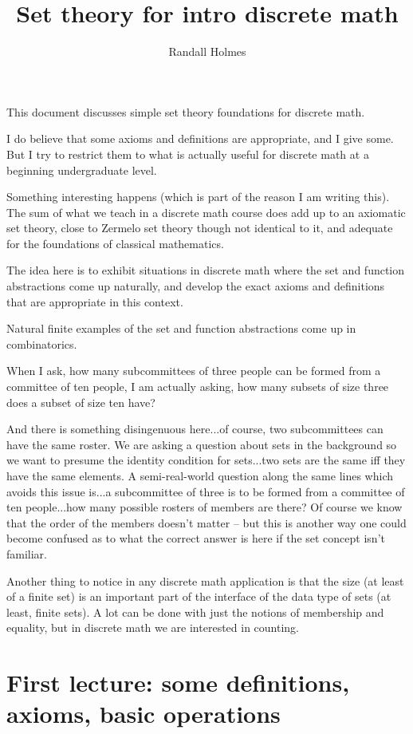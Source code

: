 \documentclass[12pt]{article}
\title{Set theory for intro discrete math}
\author{Randall Holmes}
\begin{document}
\maketitle

This document discusses simple set theory foundations for discrete math.

I do believe that some axioms and definitions are appropriate, and I give some.  But I try to restrict them to what is actually useful for discrete math at a beginning undergraduate level.

Something interesting happens (which is part of the reason I am writing this).  The sum of what we teach in a discrete math course does add up to an axiomatic set theory, close to Zermelo set theory though not identical to it, and adequate for the foundations of classical mathematics.

The idea here is to exhibit situations in discrete math where the set and function abstractions come up naturally, and develop the exact axioms and definitions that are appropriate in this context.

Natural finite examples of the set and function abstractions come up in combinatorics.

When I ask, how many subcommittees of three people can be formed from a committee of ten people, I am actually asking, how many subsets of size three does a subset of size ten have?

And there is something disingenuous here...of course, two subcommittees can have the same roster.  We are asking a question about sets in the background so we want to presume the identity condition for sets...two sets are the same iff they have the same elements.   A semi-real-world question along the same lines which avoids this issue is...a subcommittee of three is to be formed from a committee of ten people...how many possible rosters of members are there?  Of course we know that the order of the members doesn't matter -- but this is another way one could become confused as to what the correct answer is here if the set concept isn't familiar.

Another thing to notice in any discrete math application is that the size (at least of a finite set) is an important part of the interface of the data type of sets (at least, finite sets).  A lot can be done with just the notions of membership and equality, but in discrete math we are interested in counting.

\section{First lecture:  some definitions, axioms, basic operations}
\end{document}
